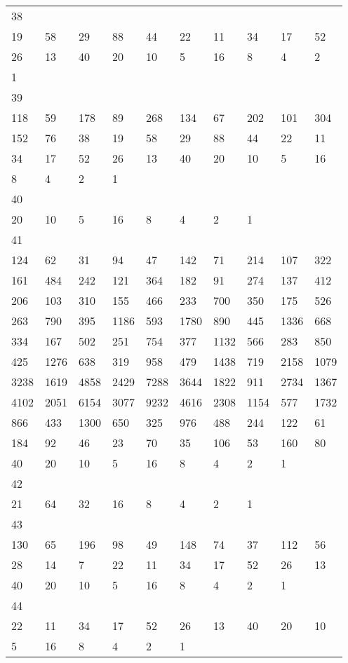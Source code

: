 \begin{longtable}{*{10}{l}}
38&&&&&&&&&\\
19& 58& 29& 88& 44& 22& 11& 34& 17& 52\\
26& 13& 40& 20& 10& 5& 16& 8& 4& 2\\
1& \\

39&&&&&&&&&\\
118& 59& 178& 89& 268& 134& 67& 202& 101& 304\\
152& 76& 38& 19& 58& 29& 88& 44& 22& 11\\
34& 17& 52& 26& 13& 40& 20& 10& 5& 16\\
8& 4& 2& 1& \\

40&&&&&&&&&\\
20& 10& 5& 16& 8& 4& 2& 1& \\

41&&&&&&&&&\\
124& 62& 31& 94& 47& 142& 71& 214& 107& 322\\
161& 484& 242& 121& 364& 182& 91& 274& 137& 412\\
206& 103& 310& 155& 466& 233& 700& 350& 175& 526\\
263& 790& 395& 1186& 593& 1780& 890& 445& 1336& 668\\
334& 167& 502& 251& 754& 377& 1132& 566& 283& 850\\
425& 1276& 638& 319& 958& 479& 1438& 719& 2158& 1079\\
3238& 1619& 4858& 2429& 7288& 3644& 1822& 911& 2734& 1367\\
4102& 2051& 6154& 3077& 9232& 4616& 2308& 1154& 577& 1732\\
866& 433& 1300& 650& 325& 976& 488& 244& 122& 61\\
184& 92& 46& 23& 70& 35& 106& 53& 160& 80\\
40& 20& 10& 5& 16& 8& 4& 2& 1& \\

42&&&&&&&&&\\
21& 64& 32& 16& 8& 4& 2& 1& \\

43&&&&&&&&&\\
130& 65& 196& 98& 49& 148& 74& 37& 112& 56\\
28& 14& 7& 22& 11& 34& 17& 52& 26& 13\\
40& 20& 10& 5& 16& 8& 4& 2& 1& \\

44&&&&&&&&&\\
22& 11& 34& 17& 52& 26& 13& 40& 20& 10\\
5& 16& 8& 4& 2& 1& \\


\end{longtable}
